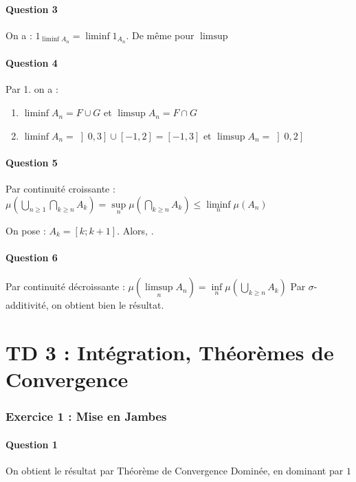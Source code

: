\documentclass{cours}
\begin{document}
\subsection{Question 3}
On a : $1_{\liminf A_{n}} = \liminf 1_{A_{n}}$. De même pour $\limsup$

\subsection{Question 4}
Par 1. on a : 
\begin{enumerate}
    \item $\liminf A_{n} = F \cup G$ et $\limsup A_{n} = F \cap G$
    \item $\liminf A_{n} = \left]0, 3\right] \cup \left[-1, 2\right] = \left[-1, 3\right]$ et $\limsup A_{n} = \left]0, 2 \right]$
\end{enumerate}

\subsection{Question 5}
Par continuité croissante : $\mu\left(\bigcup\limits_{n \geq 1} \bigcap\limits_{k\geq n}A_{k} \right) = \sup\limits_{n} \mu\left(\bigcap\limits_{k \geq n} A_{k}\right) \leq \liminf\limits_{n} \mu\left(A_{n}\right)$

On pose : $A_{k} = \left[k; k+1\right]$. Alors, \qedsymbol.

\subsection{Question 6}
Par continuité décroissante : $\mu\left(\limsup\limits_{n}A_{n}\right) = \inf\limits_{n} \mu\left(\bigcup\limits_{k \geq n} A_{k}\right)$
Par $\sigma$-additivité, on obtient bien le résultat.

\part{TD 3 : Intégration, Théorèmes de Convergence}
\section{Exercice 1 : Mise en Jambes}
\subsection{Question 1}
    On obtient le résultat par Théorème de Convergence Dominée, en dominant par $1$
\end{document}
